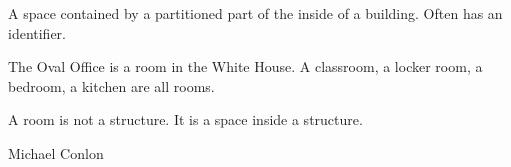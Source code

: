 \documentclass[letterpaper,10pt,english]{sphinxmanual}
\begin{document}
\begin{sphinxShadowBox}

\sphinxAtStartPar
{\hyperref[\detokenize{doc-BFO_0000029::doc}]{}}
\end{sphinxShadowBox}

\begin{sphinxShadowBox}

\sphinxAtStartPar
A space contained by a partitioned part of the inside of a building.  Often has an identifier.
\end{sphinxShadowBox}

\begin{sphinxShadowBox}

\sphinxAtStartPar
{}
\end{sphinxShadowBox}

\begin{sphinxShadowBox}

\sphinxAtStartPar
The Oval Office is a room in the White House.  A classroom, a locker room, a bedroom, a kitchen are all rooms.
\end{sphinxShadowBox}

\begin{sphinxShadowBox}

\sphinxAtStartPar
A room is not a structure.  It is a space inside a structure.
\end{sphinxShadowBox}

\begin{sphinxShadowBox}

\sphinxAtStartPar
{}
\end{sphinxShadowBox}

\begin{sphinxShadowBox}

\sphinxAtStartPar
Michael Conlon 
\end{sphinxShadowBox}
\begin{quote}

\ignorespaces \end{quote}
\end{document}
